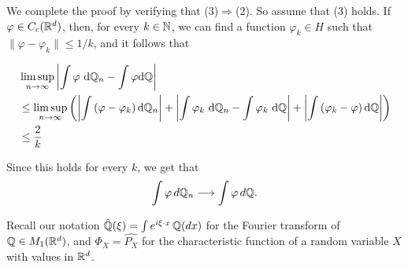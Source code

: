 \documentclass[../Main.tex]{subfiles}
\begin{document}
{We complete the proof by verifying that (3)$\Rightarrow$(2). So assume that (3) holds. If $\varphi \in C_c(\mathbb{R}^d)$, then, for every $k \in \mathbb{N}$, we can find a function $\varphi_k \in H$ such that
$\|\varphi-\varphi_k\|\le 1/k$, and it follows that

\begin{align*}
    & \limsup _{n \rightarrow \infty}\left|\int \varphi \mathrm{~d} \mathbb{Q}_n-\int \varphi \mathrm{d} \mathbb{Q}\right| \\
    & \leq \limsup _{n \rightarrow \infty}\left(\left|\int\left(\varphi-\varphi_k\right) \mathrm{d} \mathbb{Q}_n\right|+\left|\int \varphi_k \mathrm{~d} \mathbb{Q}_n-\int \varphi_k \mathrm{~d} \mathbb{Q}\right|+\left|\int\left(\varphi_k-\varphi\right) \mathrm{d} \mathbb{Q}\right|\right) \\
    & \leq \frac{2}{k}
\end{align*}


Since this holds for every $k$, we get that
\[\int \varphi\, d\mathbb{Q}_n \longrightarrow \int \varphi\, d\mathbb{Q}.\]
}
Recall our notation $\hat{\mathbb{Q}}(\xi) = \int e^{i\xi\cdot x}\,\mathbb{Q}(dx)$ for the Fourier transform of
$\mathbb{Q} \in M_1(\mathbb{R}^d)$, and $\Phi_X=\widehat{P_X}$ for the characteristic function of a random variable $X$
with values in $\mathbb{R}^d$.
\end{document}
